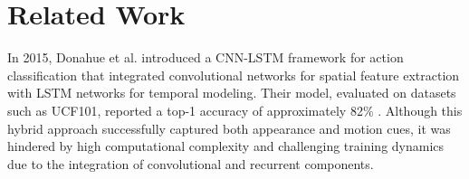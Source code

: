 \documentclass[journal,onecolumn, 11pt]{IEEEtran}
\begin{document}
%






\section{Related Work}

In 2015, Donahue et al. introduced a CNN-LSTM framework for action classification that integrated convolutional networks for spatial feature extraction with LSTM networks for temporal modeling. Their model, evaluated on datasets such as UCF101, reported a top-1 accuracy of approximately 82\% \cite{donahue2015}. Although this hybrid approach successfully captured both appearance and motion cues, it was hindered by high computational complexity and challenging training dynamics due to the integration of convolutional and recurrent components.
\end{document}
